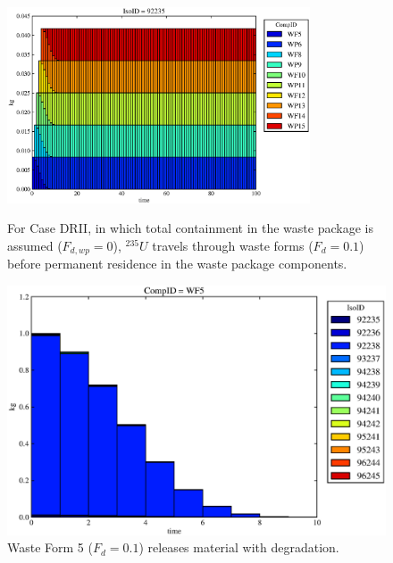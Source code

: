\begin{figure}[ht]
\centering
\includegraphics[width=0.8\textwidth]{./chapters/demonstration/base/drII.eps}
\caption[$^{235}U$ residence. Degradation Rate Waste Package No Release.]{
For Case DRII, in which total containment in the waste package is assumed ($F_{d,wp}=0$), 
$^{235}U$ travels through waste forms ($F_d = 0.1$) before 
permanent residence in the waste package components.
}
\label{fig:drIIall}
\begin{minipage}[b]{0.45\linewidth}

  \includegraphics[width=\textwidth]{./chapters/demonstration/base/drII1.eps}
  \caption[DRII Waste Form Contaminants.]{
    Waste Form 5 ($F_d = 0.1$) releases material with degradation. 
    }
  \label{fig:drIIwf5}
  

\end{minipage}
\end{figure}
